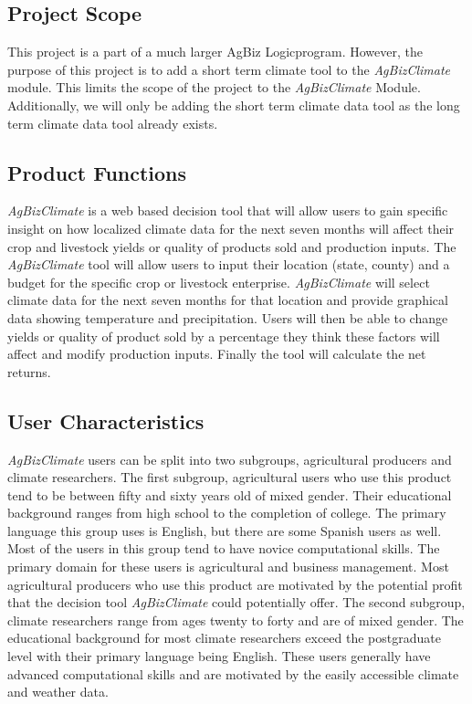 \documentclass[onecolumn, draftclsnofoot,10pt, compsoc]{article}
\begin{document}
    \subsection{Project Scope}
		This project is a part of a much larger AgBiz Logic\texttrademark program. However, the purpose of this project is to add a short term climate tool to the \textit{AgBizClimate} module. This limits the scope of the project to the \textit{AgBizClimate} Module. Additionally, we will only be adding the short term climate data tool as the long term climate data tool already exists.\\



	\subsection {Product Functions}
			\textit{AgBizClimate} is a web based decision tool that will allow users to gain specific insight on how localized climate data for the next seven months will affect their crop and livestock yields or quality of products sold and production inputs. The \textit{AgBizClimate} tool will allow users to input their location (state, county) and a budget for the specific crop or livestock enterprise. \textit{AgBizClimate} will select climate data for the next seven months for that location and provide graphical data showing temperature and precipitation. Users will then be able to change yields or quality of product sold by a percentage they think these factors will affect and modify production inputs. Finally the tool will calculate the net returns.\\

	\subsection{User Characteristics}
		\textit{AgBizClimate} users can be split into two subgroups, agricultural producers and climate researchers. The first subgroup, agricultural users who use this product tend to be between fifty and sixty years old of mixed gender. Their educational background ranges from high school to the completion of college. The primary language this group uses is English, but there are some Spanish users as well. Most of the users in this group tend to have novice computational skills. The primary domain for these users is agricultural and business management. Most agricultural producers who use this product are motivated by the potential profit that the decision tool \textit{AgBizClimate} could potentially offer. The second subgroup, climate researchers range from ages twenty to forty and are of mixed gender. The educational background for most climate researchers  exceed the postgraduate level with their primary language being English. These users generally have advanced computational skills and are motivated by the easily accessible climate and weather data.\\
\end{document}

